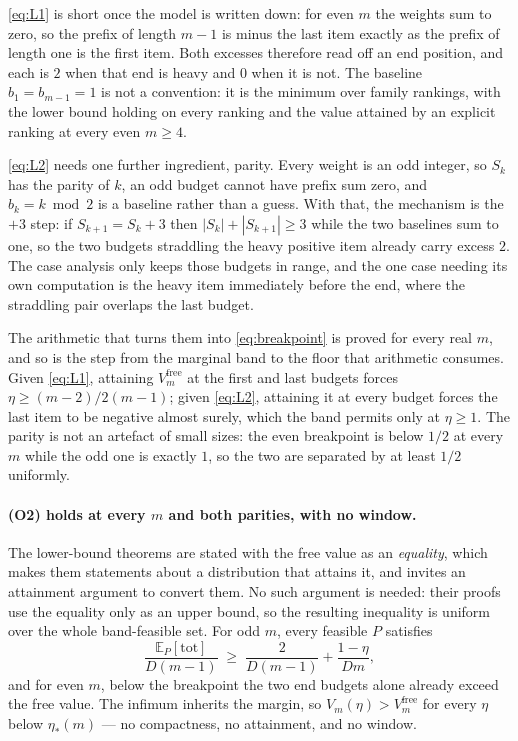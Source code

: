 \eqref{eq:L1} is short once the model is written down: for even $m$ the weights sum to
zero, so the prefix of length $m-1$ is minus the last item exactly as the prefix of length
one is the first item. Both excesses therefore read off an end position, and each is $2$
when that end is heavy and $0$ when it is not. The baseline $b_{1}=b_{m-1}=1$ is not a
convention: it is the minimum over family rankings, with the lower bound holding on every
ranking and the value attained by an explicit ranking at every even $m\ge4$.

\eqref{eq:L2} needs one further ingredient, parity. Every weight is an odd integer, so
$S_{k}$ has the parity of $k$, an odd budget cannot have prefix sum zero, and $b_{k}=k\bmod
2$ is a baseline rather than a guess. With that, the mechanism is the $+3$ step: if
$S_{k+1}=S_{k}+3$ then $|S_{k}|+|S_{k+1}|\ge3$ while the two baselines sum to one, so the
two budgets straddling the heavy positive item already carry excess $2$. The case analysis
only keeps those budgets in range, and the one case needing its own computation is the heavy
item immediately before the end, where the straddling pair overlaps the last budget.

The arithmetic that turns them into \eqref{eq:breakpoint} is proved for every real $m$, and
so is the step from the marginal band to the floor that arithmetic consumes. Given
\eqref{eq:L1}, attaining $V^{\mathrm{free}}_{m}$ at the first and last budgets forces
$\eta\ge(m-2)/2(m-1)$; given \eqref{eq:L2}, attaining it at every budget forces the last
item to be negative almost surely, which the band permits only at $\eta\ge1$. The parity is
not an artefact of small sizes: the even breakpoint is below $1/2$ at every $m$ while the
odd one is exactly $1$, so the two are separated by at least $1/2$ uniformly.


\paragraph{(O2) holds at every $m$ and both parities, with no window.}
The lower-bound theorems are stated with the free value as an \emph{equality}, which makes
them statements about a distribution that attains it, and invites an attainment argument
to convert them. No such argument is needed: their proofs use the equality only as an
upper bound, so the resulting inequality is uniform over the whole band-feasible set. For
odd $m$, every feasible $P$ satisfies
\[
\frac{\mathbb{E}_{P}[\mathrm{tot}]}{D(m-1)}
\;\ge\;
\frac{2}{D(m-1)}+\frac{1-\eta}{Dm},
\]
and for even $m$, below the breakpoint the two end budgets alone already exceed the free
value. The infimum inherits the margin, so $V_{m}(\eta)>V^{\mathrm{free}}_{m}$ for every
$\eta$ below $\eta_{*}(m)$ --- no compactness, no attainment, and no window.

